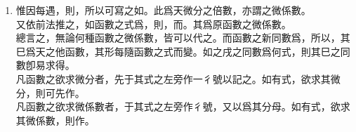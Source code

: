\begin{enumerate} [label={第\chinese*款},nolistsep]
	如有式\CJKmove，則\CJKmove。此式之意謂戌之微分等于\CJKmove 乘天之微分。猶言函數戌之溢率等于以\CJKmove 乘其天之溢率也。如有式\CJKmove，則\CJKmove。此式之意謂戌之微分等于\CJKmove 乘天之微分。猶言函數戌之溢率等于以\CJKmove 乘其天之溢率也。
	\item 惟因每遇\CJKmove，則\CJKmove，所以可寫之如\CJKmove。此爲天微分之倍數，亦謂之微係數。\\
	又依前法推之，如函數之式爲\CJKmove，則\CJKmove，而\CJKmove。其\CJKmove 爲原函數\CJKmove 之微係數。\\
	總言之，無論何種函數之微係數，皆可以\CJKmove 代之。而函數之新同數爲\CJKmove，所以\CJKmove，其巳爲天之他函數，其形每隨函數之式而變。如之戌之同數爲何式，則其巳之同數卽易求得。\\
	凡函數之欲求微分者，先于其式之左旁作一彳號以記之。如有\CJKmove 式，欲求其微分，則可先作\CJKmove。\\
	凡函數之欲求微係數者，于其式之左旁作彳號，又以\CJKmove 爲其分母。如有\CJKmove 式，欲求其微係數，則作\CJKmove。\\

\end{enumerate}
